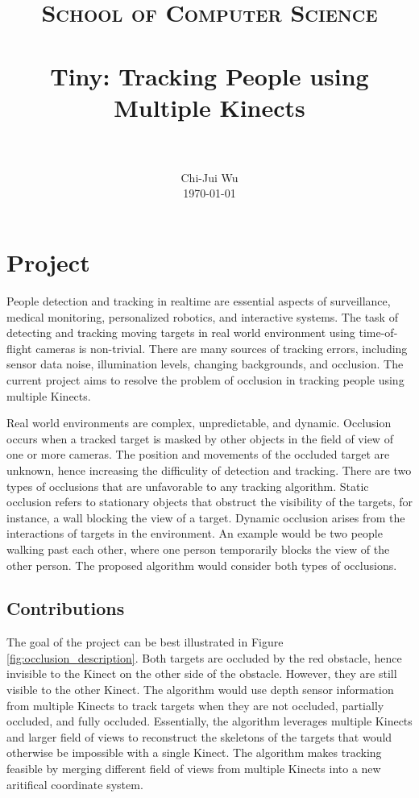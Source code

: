 \documentclass[paper=a4, fontsize=11pt]{scrartcl}
\title{
		\vspace{-3ex}
		\usefont{OT1}{bch}{b}{n}
		\normalfont \normalsize \textsc{School of Computer Science} \\ [25pt]
		\horrule{0.5pt} \\[0.4cm]
		\huge Tiny: Tracking People using Multiple Kinects \\
		\horrule{2pt} \\[0.5cm]
		\vspace{-2ex}
}
\author{
		\normalfont 								\normalsize
        Chi-Jui Wu\\[-3pt]		\normalsize
        \today
}
\date{}
\numberwithin{equation}{section}		%
\numberwithin{figure}{section}			%
\numberwithin{table}{section}				%
\begin{document}
\maketitle

\section{Project}

People detection and tracking in realtime are essential aspects of surveillance, medical monitoring, personalized robotics, and interactive systems. The task of detecting and tracking moving targets in real world environment using time-of-flight cameras is non-trivial. There are many sources of tracking errors, including sensor data noise, illumination levels, changing backgrounds, and occlusion. The current project aims to resolve the problem of occlusion in tracking people using multiple Kinects.

Real world environments are complex, unpredictable, and dynamic. Occlusion occurs when a tracked target is masked by other objects in the field of view of one or more cameras. The position and movements of the occluded target are unknown, hence increasing the difficulity of detection and tracking. There are two types of occlusions that are unfavorable to any tracking algorithm. Static occlusion refers to stationary objects that obstruct the visibility of the targets, for instance, a wall blocking the view of a target. Dynamic occlusion arises from the interactions of targets in the environment. An example would be two people walking past each other, where one person temporarily blocks the view of the other person. The proposed algorithm would consider both types of occlusions.

\subsection{Contributions}

The goal of the project can be best illustrated in Figure \ref{fig:occlusion_description}. Both targets are occluded by the red obstacle, hence invisible to the Kinect on the other side of the obstacle. However, they are still visible to the other Kinect. The algorithm would use depth sensor information from multiple Kinects to track targets when they are not occluded, partially occluded, and fully occluded. Essentially, the algorithm leverages multiple Kinects and larger field of views to reconstruct the skeletons of the targets that would otherwise be impossible with a single Kinect. The algorithm makes tracking feasible by merging different field of views from multiple Kinects into a new aritifical coordinate system.
\end{document}
